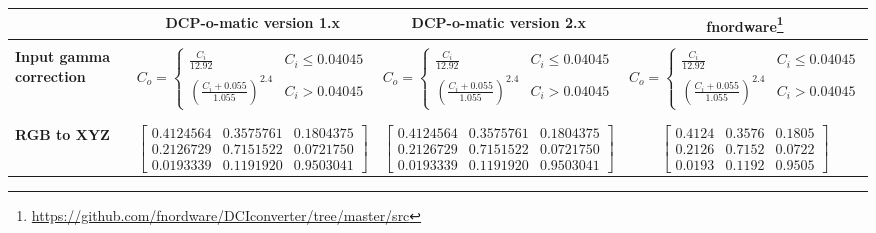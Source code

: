 \documentclass{article}
\begin{document}
\begin{minipage}{\textwidth}
\begin{tabular}{|l|c|c|c|}
\hline
& \textbf{DCP-o-matic version 1.x}
& \textbf{DCP-o-matic version 2.x}
& \textbf{fnordware}\footnote{\url{https://github.com/fnordware/DCIconverter/tree/master/src}} \\

\hline
& & & \\
\parbox[c][2em][c]{2cm}{\textbf{Input gamma correction}} &
$C_o = \left\{ \begin{array}{ll} \frac{C_i}{12.92} & C_i \leq 0.04045 \\ \left(\frac{C_i + 0.055}{1.055}\right)^{2.4} & C_i > 0.04045 \end{array} \right.$ &
$C_o = \left\{ \begin{array}{ll} \frac{C_i}{12.92} & C_i \leq 0.04045 \\ \left(\frac{C_i + 0.055}{1.055}\right)^{2.4} & C_i > 0.04045 \end{array} \right.$ &
$C_o = \left\{ \begin{array}{ll} \frac{C_i}{12.92} & C_i \leq 0.04045 \\ \left(\frac{C_i + 0.055}{1.055}\right)^{2.4} & C_i > 0.04045 \end{array} \right.$ \\
& & & \\

\hline
& & & \\
\textbf{RGB to XYZ} &
$\left[\begin{array}{lll} 0.4124564 & 0.3575761 & 0.1804375 \\
                          0.2126729 & 0.7151522 & 0.0721750 \\
	                  0.0193339 & 0.1191920 & 0.9503041 \end{array}\right]$ &

$\left[\begin{array}{lll} 0.4124564 & 0.3575761 & 0.1804375 \\
                          0.2126729 & 0.7151522 & 0.0721750 \\
	                  0.0193339 & 0.1191920 & 0.9503041 \end{array}\right]$ &

$\left[\begin{array}{lll} 0.4124 & 0.3576 & 0.1805 \\
                          0.2126 & 0.7152 & 0.0722 \\
                          0.0193 & 0.1192 & 0.9505 \end{array}\right]$ \\[2em]


\end{tabular}
\end{minipage}
\end{document}
